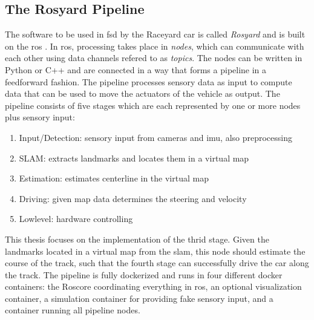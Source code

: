 \subsection{The Rosyard Pipeline}
The software to be used in \ac{fsd} by the Raceyard car is called \emph{Rosyard} and is built on the \ac{ros} \cite{ros}.
In \ac{ros}, processing takes place in \emph{nodes}, which can communicate with each other using data channels refered to as \emph{topics}. The nodes can be written in Python or C++ and are connected in a way that forms a pipeline in a feedforward fashion. The pipeline processes sensory data as input to compute data that can be used to move the actuators of the vehicle as output. The pipeline consists of five stages which are each represented by one or more nodes plus sensory input:
\begin{enumerate}
    \item Input/Detection: sensory input from cameras and \ac{imu}, also preprocessing
    \item SLAM: extracts landmarks and locates them in a virtual map
    \item Estimation: estimates centerline in the virtual map
    \item Driving: given map data determines the steering and velocity
    \item Lowlevel: hardware controlling
\end{enumerate}
This thesis focuses on the implementation of the thrid stage. Given the landmarks located in a virtual map from the \ac{slam}, this node should estimate the course of the track, such that the fourth stage can successfully drive the car along the track.
The pipeline is fully dockerized and runs in four different docker containers: the Roscore coordinating everything in \ac{ros}, an optional visualization container, a simulation container for providing fake sensory input, and a container running all pipeline nodes.

